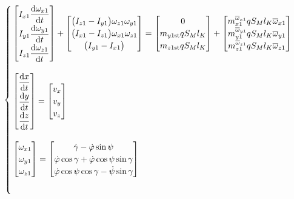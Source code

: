 \begin{equation}
\begin{cases}
 	\,  
 	\begin{bmatrix}
 		I_{x1} \dfrac{{\rm{d}} \omega_{x1}}{{\rm{d}} t} \\[0.5em]
 		I_{y1} \dfrac{{\rm{d}} \omega_{y1}}{{\rm{d}} t} \\[0.5em]
 		I_{z1} \dfrac{{\rm{d}} \omega_{z1}}{{\rm{d}} t}
 	\end{bmatrix}
 	+ 
 	\begin{bmatrix}
 		\big(I_{z1} - I_{y1}\big)\omega_{z1}\omega_{y1} \\
 		\big(I_{x1} - I_{z1}\big)\omega_{x1}\omega_{z1} \\
 		\big(I_{y1} - I_{x1}\big)
 	\end{bmatrix}
 	=
 	\begin{bmatrix}
 		0 \\
 		m_{y1\text{st}}q S_M l_K \\
 		m_{z1\text{st}}q S_M l_K 
 	\end{bmatrix}
 	+
 	\begin{bmatrix}
 		m_{x1}^{\overline{\omega}_{x1}}q S_M l_K\overline{\omega}_{x1}\\
 		m_{y1}^{\overline{\omega}_{y1}}q S_M l_K\overline{\omega}_{y1}\\
 		m_{z1}^{\overline{\omega}_{z1}}q S_M l_K\overline{\omega}_{z1}
 	\end{bmatrix}
 	\\[4em]
 	
 	\, 
 	\begin{bmatrix}
 		\dfrac{{\rm{d}} x}{{\rm{d}} t} \\[0.5em]
 		\dfrac{{\rm{d}} y}{{\rm{d}} t} \\[0.5em]
 		\dfrac{{\rm{d}} z}{{\rm{d}} t} 
 	\end{bmatrix}
	=
	\begin{bmatrix}
		v_x \\
		v_y \\
		v_z
	\end{bmatrix}
	\\[4em]
	
	\, 
	\begin{bmatrix}
		\omega_{x1} \\
		\omega_{y1} \\
		\omega_{z1}
	\end{bmatrix}
	=
	\begin{bmatrix}
		\dot{\gamma} - \dot{\varphi}\sin \psi \\
		\dot{\varphi}\cos \gamma + \dot{\varphi}\cos \psi \sin \gamma \\
		\dot{\varphi}\cos \psi \cos \gamma - \dot{\psi}\sin \gamma
	\end{bmatrix}
	\\[3.5em]
	

\end{cases}
\end{equation}
